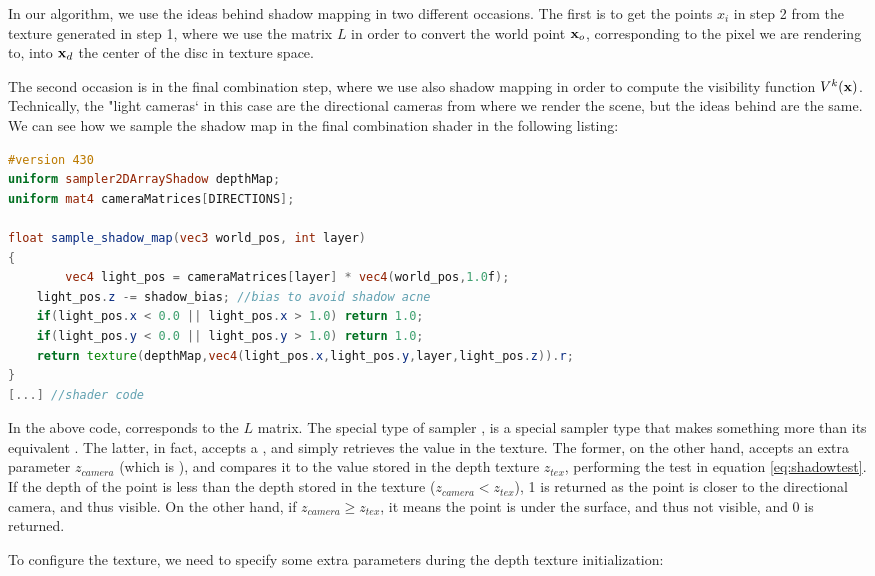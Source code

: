 In our algorithm, we use the ideas behind shadow mapping in two different occasions. The first is to get the points $x_i$ in step 2 from the texture generated in step 1, where we use the matrix $L$ in order to convert the world point $\mathbf{x}_o$, corresponding to the pixel we are rendering to, into $\mathbf{x}_d$ the center of the disc in texture space. 

The second occasion is in the final combination step, where we use also shadow mapping in order to compute the visibility function $V^k(\mathbf{x})$. Technically, the "light cameras` in this case are the directional cameras from where we render the scene, but the ideas behind are the same. We can see how we sample the shadow map in the final combination shader in the following listing:

\begin{lstlisting}[language=GLSL,caption={Sampling of the shadow map texture in step 3 of our method.}]
#version 430
uniform sampler2DArrayShadow depthMap;
uniform mat4 cameraMatrices[DIRECTIONS];

float sample_shadow_map(vec3 world_pos, int layer)
{
		vec4 light_pos = cameraMatrices[layer] * vec4(world_pos,1.0f);
    light_pos.z -= shadow_bias; //bias to avoid shadow acne
    if(light_pos.x < 0.0 || light_pos.x > 1.0) return 1.0;
    if(light_pos.y < 0.0 || light_pos.y > 1.0) return 1.0;
    return texture(depthMap,vec4(light_pos.x,light_pos.y,layer,light_pos.z)).r;
}        
[...] //shader code
\end{lstlisting}

In the above code,  corresponds to the $L$ matrix. The special type of sampler , is a special sampler type that makes something more than its equivalent . The latter, in fact, accepts a , and simply retrieves the value in the texture. The former, on the other hand, accepts an extra parameter $z_{camera}$ (which is ), and compares it to the value stored in the depth texture $z_{tex}$, performing the test in equation \ref{eq:shadowtest}. If the depth of the point is less than the depth stored in the texture ($z_{camera} < z_{tex}$), 1 is returned as the point is closer to the directional camera, and thus visible. On the other hand, if $z_{camera} \ge z_{tex}$, it means the point is under the surface, and thus not visible, and 0 is returned.

To configure the  texture, we need to specify some extra parameters during the depth texture initialization:

